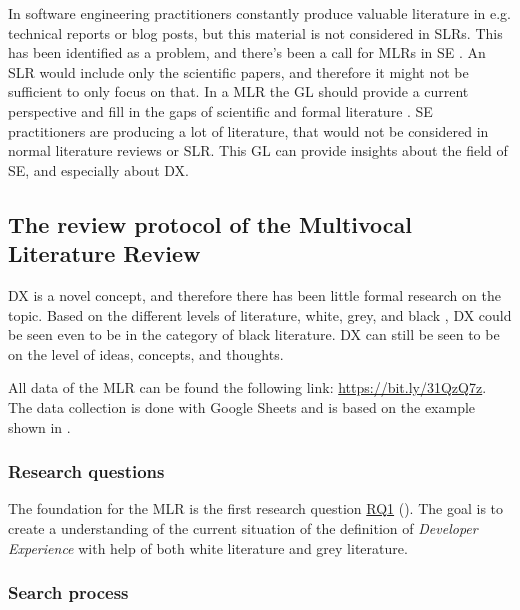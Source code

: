 \documentclass[english, 12pt, a4paper, sci, utf8, a-1b, online]{aaltothesis}
\begin{document}
In software engineering practitioners constantly produce valuable literature in e.g. technical reports or blog posts, but this material is not considered in SLRs. This has been identified as a problem, and there's been a call for MLRs in SE \citep{the-need-for-MLR}. An SLR would include only the scientific papers, and therefore it might not be sufficient to only focus on that. In a MLR the GL should provide a current perspective and fill in the gaps of scientific and formal literature \citep{guidelines-for-MLR}. SE practitioners are producing a lot of literature, that would not be considered in normal literature reviews or SLR. This GL can provide insights about the field of SE, and especially about DX.


\subsection{The review protocol of the Multivocal Literature Review}

DX is a novel concept, and therefore there has been little formal research on the topic. Based on the different levels of literature, white, grey, and black \citep{guidelines-for-MLR}, DX could be seen even to be in the category of black literature. DX can still be seen to be on the level of ideas, concepts, and thoughts.

\newcommand{\mlrdxlink}{https://bit.ly/31QzQ7z}

All data of the MLR can be found the following link: \href{\mlrdxlink}{https://bit.ly/31QzQ7z}. The data collection is done with Google Sheets and is based on the example shown in \citep{guidelines-for-MLR}.

\subsubsection{Research questions}

The foundation for the MLR is the first research question \hyperref[RQ1]{RQ1} (\rqone). The goal is to create a understanding of the current situation of the definition of \textit{Developer Experience} with help of both white literature and grey literature.

\subsubsection{Search process}
\end{document}
